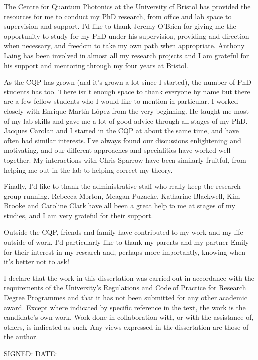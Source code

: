 \begin{acknowledgements}
The Centre for Quantum Photonics at the University of Bristol has provided the
resources for me to conduct my PhD research, from office and lab space to
supervision and support. I'd like to thank Jeremy O'Brien for giving me the
opportunity to study for my PhD under his supervision, providing and
direction when necessary, and freedom to take my own path when appropriate.
Anthony Laing has been involved in almost all my research projects and I am
grateful for his support and mentoring through my four years at Bristol.

As the CQP has grown (and it's grown a lot since I started), the number of PhD
students has too. There isn't enough space to thank everyone by name but
there are a few fellow students who I would like to mention in 
particular. I worked closely with Enrique Mart\'in L\'opez from the very
beginning. He taught me most of my lab skills and gave me a lot of good advice
through all stages of my PhD. Jacques Carolan and I started in the CQP
at about the same time, and have often had similar interests. I've always found
our discussions enlightening and motivating, and our different approaches and
specialities have worked well together. My interactions with Chris Sparrow have
been similarly fruitful, from helping me out in the lab to helping correct my
theory.

Finally, I'd like to thank the administrative staff who really keep the
research group running. Rebecca Morton, Meagan Puzacke, Katharine Blackwell,
Kim Brooke and Caroline Clark have all been a great help to me at stages of
my studies, and I am very grateful for their support.

Outside the CQP, friends and family have contributed to my work and my life
outside of work. I'd particularly like to thank my parents and my partner Emily
for their interest in my research and, perhaps more importantly, knowing when
it's better not to ask!
\end{acknowledgements}

\begin{declaration}
  I declare that the work in this dissertation was carried out in accordance
  with the requirements of the University's Regulations and Code of Practice for
  Research Degree Programmes and that it has not been submitted for any other
  academic award. Except where indicated by specific reference in the text, the
  work is the candidate's own work. Work done in collaboration with, or with the
  assistance of, others, is indicated as such. Any views expressed in the
  dissertation are those of the author.

  SIGNED: \dotfill DATE: \dotfill
\end{declaration}

\tableofcontents
\listoffigures

